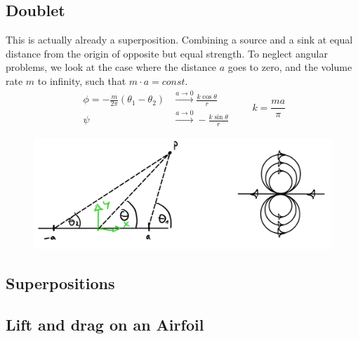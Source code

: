 \subsection{Doublet}
This is actually already a superposition. Combining a source and a sink at equal distance from the origin of opposite but equal strength. To neglect angular problems, we look at the case where the distance $a$ goes to zero, and the volume rate $m$ to infinity, such that $m\cdot a = const$.
\begin{equation*}
	\begin{split}
		\phi = -\frac{m}{2\pi}(\theta_1-\theta_2) &\stackrel{a\to 0}{\longrightarrow}\frac{k\cos\theta}r\\
	\psi &\stackrel{a\to 0}{\longrightarrow} -\frac{k\sin\theta}{r}
	\end{split}\qquad k = \frac{ma}{\pi}
\end{equation*}

\begin{figure}[H]
	\centering
	\includegraphics[width=0.4\linewidth]{Sketches/doublet_flow}
	\caption{}
	\label{fig:doubletflow}
\end{figure}


\subsection{Superpositions}

\subsection{Lift and drag on an Airfoil}